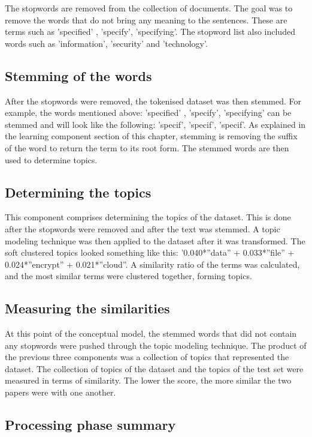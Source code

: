 The stopwords are removed from the collection of documents. The goal was to remove the words that do not bring any meaning to the sentences. These are terms such as ’specified’ , ’specify’, ’specifying’. The stopword list also included words such as ’information’, ’security’ and ’technology’.

\subsection{Stemming of the words}

After the stopwords were removed, the tokenised dataset was then stemmed. For example, the words mentioned above: ’specified’ , ’specify’, ’specifying’ can be stemmed and will look like the following: ’specif’, ’specif’, ’specif’. As explained in the learning component section of this chapter, stemming is removing the suffix of the word to return the term to its root form. The stemmed words are then used to determine topics.

\subsection{Determining the topics} \label{ssec:topic}

This component comprises determining the topics of the dataset. This is done after the stopwords were removed and after the text was stemmed.
A topic modeling technique was then applied to the dataset after it was transformed. The soft clustered topics looked something like this: ’0.040*”data” + 0.033*”file” + 0.024*”encrypt” + 0.021*”cloud”. A similarity ratio of the terms was calculated, and the most similar terms were clustered together, forming topics.

\subsection{Measuring the similarities}

At this point of the conceptual model, the stemmed words that did not contain any stopwords were pushed through the topic modeling technique. The product of the previous three components was a collection of topics that represented the dataset. The collection of topics of the dataset and the topics of the test set were measured in terms of similarity. The lower the score, the more similar the two papers were with one another.

\subsection{Processing phase summary}

